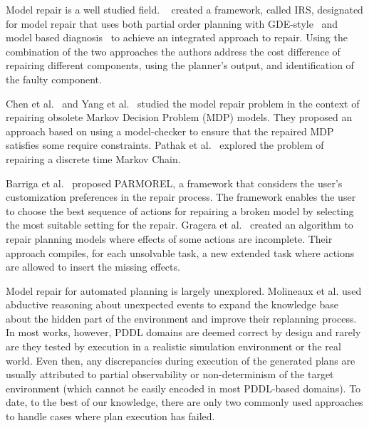 \documentclass[letterpaper]{article} %
\begin{document}
Model repair is a well studied field.  ~\citet{sun1993aFramework} created a framework, called IRS, designated for model repair that uses both partial order planning with GDE-style~\cite{dekleer1987diagnosing} and model based diagnosis~\cite{dekleer2003fundamentals} to achieve an integrated approach to repair. Using the combination of the two approaches the authors address the cost difference of repairing different components, using the planner’s output, and identification of the faulty component.


Chen et al.~ and Yang et al.~ studied the model repair problem in the context of repairing obsolete Markov Decision Problem (MDP) models. They proposed an approach based on using a model-checker to ensure that the repaired MDP satisfies some require constraints. Pathak et al.~ explored the problem of repairing a discrete time Markov Chain. 

Barriga et al.~ proposed PARMOREL, a framework that considers the user’s customization preferences in the repair process. The framework enables the user to choose the best sequence of actions for repairing a broken model by selecting the most suitable setting for the repair. 
Gragera et al.~ created an algorithm to repair planning models where effects of some actions are incomplete. Their approach compiles, for each unsolvable task, a new extended task where actions are allowed to insert the missing effects. 

Model repair for automated planning is largely unexplored. Molineaux et al. used abductive reasoning about unexpected events to expand the knowledge base about the hidden part of the environment and improve their replanning process. In most works, however, PDDL domains are deemed correct by design and rarely are they tested by execution in a realistic simulation environment or the real world. Even then, any discrepancies during execution of the generated plans are usually attributed to partial observability or non-determinism of the target environment (which cannot be easily encoded in most PDDL-based domains). To date, to the best of our knowledge, there are only two commonly used approaches to handle cases where plan execution has failed. 
\end{document}
